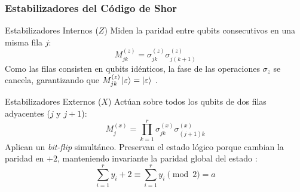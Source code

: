\begin{frame}
  \frametitle{Estabilizadores del Código de Shor}

  \begin{block}{Estabilizadores Internos ($Z$)}
    Miden la paridad entre qubits consecutivos en una misma fila $j$:
    \begin{equation*}
      M_{jk}^{(z)} = \sigma_{jk}^{(z)} \sigma_{j(k + 1)}^{(z)}
    \end{equation*}
    Como las filas consisten en qubits idénticos, la fase de las operaciones $\sigma_z$ se cancela, garantizando que $M_{jk}^{(z)} \ket{\varepsilon} = \ket{\varepsilon}$ \citep{Cesar2024}.
  \end{block}

  \vspace{0.2cm}

  \begin{block}{Estabilizadores Externos ($X$)}
    Actúan sobre todos los qubits de dos filas adyacentes ($j$ y $j+1$):
    \begin{equation*}
      M_j^{(x)} = \prod_{k = 1}^{r}\sigma_{jk}^{(x)}\sigma_{(j + 1)k}^{(x)}
    \end{equation*}
    Aplican un \textit{bit-flip} simultáneo. Preservan el estado lógico porque cambian la paridad en $+2$, manteniendo invariante la paridad global del estado \citep{Cesar2024}:
    \begin{equation*}
      \sum_{i=1}^r y_i + 2 \equiv \sum_{i=1}^r y_i \pmod{2} = a
    \end{equation*}
  \end{block}
\end{frame}
